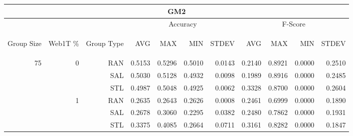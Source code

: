 \begin{center}
\begin{table}[htbp] 
 \begin{center}
\begin{tabular}{ | r | r | r | r | r | r | r | r | r | r | r |}
\hline
\multicolumn{11}{|c|}{GM2}\\
\hline
 & & & \multicolumn{4}{|c|}{Accuracy} & \multicolumn{4}{|c|}{F-Score}\\ \cline{4-11}
\begin{sideways}Group Size\end{sideways} & \begin{sideways}Web1T \%\end{sideways} & \begin{sideways}Group Type\end{sideways} & \begin{sideways}AVG\end{sideways} & \begin{sideways}MAX\end{sideways} & \begin{sideways}MIN\end{sideways} & \begin{sideways}STDEV\end{sideways} & \begin{sideways}AVG\end{sideways} & \begin{sideways}MAX\end{sideways} & \begin{sideways}MIN\end{sideways} & \begin{sideways}STDEV\end{sideways}\\
\hline
\multirow{18}{*}{75}
 & \multirow{3}{*}{0} & RAN & 0.5153 & 0.5296 & 0.5010 & 0.0143 & 0.2140 & 0.8921 & 0.0000 & 0.2510\\ \cline{3-11}
 &   & SAL & 0.5030 & 0.5128 & 0.4932 & 0.0098 & 0.1989 & 0.8916 & 0.0000 & 0.2485\\ \cline{3-11}
 &   & STL & 0.4987 & 0.5048 & 0.4925 & 0.0062 & 0.3328 & 0.8700 & 0.0000 & 0.2604\\ \cline{2-11}
 & \multirow{3}{*}{1} & RAN & 0.2635 & 0.2643 & 0.2626 & 0.0008 & 0.2461 & 0.6999 & 0.0000 & 0.1890\\ \cline{3-11}
 &   & SAL & 0.2678 & 0.3060 & 0.2295 & 0.0382 & 0.2480 & 0.7862 & 0.0000 & 0.1931\\ \cline{3-11}
 &   & STL & 0.3375 & 0.4085 & 0.2664 & 0.0711 & 0.3161 & 0.8282 & 0.0000 & 0.1847\\ \cline{2-11}

\end{tabular}
\end{center}
\end{table}
\end{center}

